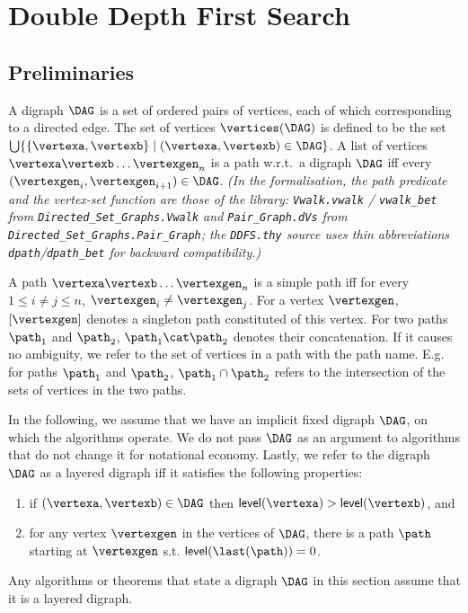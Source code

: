 \section{Double Depth First Search}

\subsection{Preliminaries}

\newcommand{\ddfs}{\textsf{\upshape ddfs}}
\newcommand{\digraph}{\DAG}
\newcommand{\level}{\textsf{\upshape level}}
\renewcommand{\choice}{\textsf{\upshape choose}}
\newcommand{\visa}{\ensuremath{\vis_1}}
\newcommand{\visb}{\ensuremath{\vis_2}}
\newcommand{\patha}{\ensuremath{\path_1}}
\newcommand{\pathb}{\ensuremath{\path_2}}
\newcommand{\Plevel}[1]{\ensuremath{P_{#1}}}
\newcommand{\butlast}{\textsf{\upshape butlast}}

A digraph $\digraph$ is a set of ordered pairs of vertices, each of which corresponding to a directed edge.
The set of vertices $\vertices(\DAG)$ is defined to be the set $\bigcup\{\{\vertexa,\vertexb\}\mid(\vertexa,\vertexb)\in\digraph\}$.
A list of vertices $\vertexa\vertexb\dots\vertexgen_n$ is a path w.r.t.\ a digraph $\digraph$ iff every $(\vertexgen_i, \vertexgen_{i+1})\in\digraph$.
\emph{(In the formalisation, the path predicate and the vertex-set function are those of the library: \texttt{Vwalk.vwalk} / \texttt{vwalk\_bet} from \texttt{Directed\_Set\_Graphs.Vwalk} and \texttt{Pair\_Graph.dVs} from \texttt{Directed\_Set\_Graphs.Pair\_Graph}; the \texttt{DDFS.thy} source uses thin abbreviations \texttt{dpath}/\texttt{dpath\_bet} for backward compatibility.)}

A path $\vertexa\vertexb\dots\vertexgen_n$ is a simple path iff for every $1\leq i\neq j\leq n$, $\vertexgen_i \neq \vertexgen_j$.
For a vertex $\vertexgen$, $[\vertexgen]$ denotes a singleton path constituted of this vertex.
For two paths $\patha$ and $\pathb$, $\patha\cat\pathb$ denotes their concatenation.
If it causes no ambiguity, we refer to the set of vertices in a path with the path name.
E.g. for paths $\patha$ and $\pathb$, $\patha\cap\pathb$ refers to the intersection of the sets of vertices in the two paths.


In the following, we assume that we have an implicit fixed digraph $\DAG$, on which the algorithms operate.
We do not pass $\DAG$ as an argument to algorithms that do not change it for notational economy.
Lastly, we refer to the digraph $\DAG$ as a layered digraph iff it satisfies the following properties:
\begin{enumerate}
\item if $(\vertexa,\vertexb)\in\DAG$ then $\level(\vertexa) > \level(\vertexb)$, and
\item for any vertex $\vertexgen$ in the vertices of $\digraph$, there is a path $\path$ starting at $\vertexgen$ s.t. $\level(\last(\path)) = 0$.
\end{enumerate}
Any algorithms or theorems that state a digraph $\DAG$ in this section assume that it is a layered digraph.



